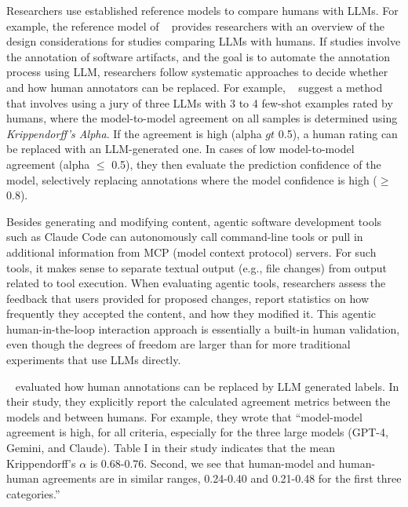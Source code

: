 Researchers \should use established reference models to compare humans with LLMs.
For example, the reference model of \citeauthor{Schneider2025ReferenceModel}~\cite{Schneider2025ReferenceModel} provides researchers with an overview of the design considerations for studies comparing LLMs with humans.
If studies involve the annotation of software artifacts, and the goal is to automate the annotation process using LLM, researchers \should follow systematic approaches to decide whether and how human annotators can be replaced.
For example, \citeauthor{DBLP:conf/msr/AhmedDTP25}~\cite{DBLP:conf/msr/AhmedDTP25} suggest a method that involves using a jury of three LLMs with 3 to 4 few-shot examples rated by humans, where the model-to-model agreement on all samples is determined using \emph{Krippendorff's Alpha}.
If the agreement is high (alpha $gt$ 0.5), a human rating can be replaced with an LLM-generated one.
In cases of low model-to-model agreement (alpha $\le$ 0.5), they then evaluate the prediction confidence of the model, selectively replacing annotations where the model confidence is high ($\ge$ 0.8).

Besides generating and modifying content, agentic software development tools such as Claude Code can autonomously call command-line tools or pull in additional information from MCP (model context protocol) servers.
For such tools, it makes sense to separate textual output (e.g., file changes) from output related to tool execution.
When evaluating agentic tools, researchers \should assess the feedback that users provided for proposed changes, report statistics on how frequently they accepted the content, and how they modified it.
This agentic human-in-the-loop interaction approach is essentially a built-in human validation, even though the degrees of freedom are larger than for more traditional experiments that use LLMs directly.


\citeauthor{DBLP:conf/msr/AhmedDTP25}~\cite{DBLP:conf/msr/AhmedDTP25} evaluated how human annotations can be replaced by LLM generated labels.
In their study, they explicitly report the calculated agreement metrics between the models and between humans.
For example, they wrote that ``model-model agreement is high, for all criteria, especially for the three large models (GPT-4, Gemini, and Claude). Table I in their study indicates that the mean Krippendorff's $\alpha$ is 0.68-0.76.  Second, we see that human-model and human-human agreements are in similar ranges, 0.24-0.40 and 0.21-0.48 for the first three categories.''

